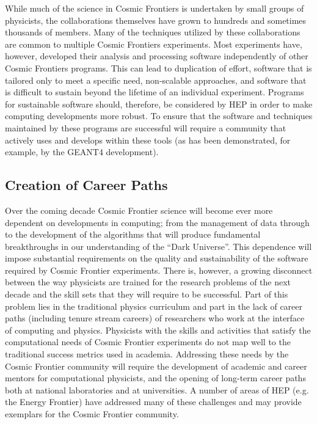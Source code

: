 While much of the science in Cosmic Frontiers is undertaken by small
groups of physicists, the collaborations themselves have grown to
hundreds and sometimes thousands of members. Many of the techniques
utilized by these collaborations are common to multiple Cosmic
Frontiers experiments. Most experiments have, however, developed their
analysis and processing software independently of other Cosmic
Frontiers programs. This can lead to duplication of effort, software
that is tailored only to meet a specific need, non-scalable
approaches, and software that is difficult to sustain beyond the
lifetime of an individual experiment. Programs for sustainable
software should, therefore, be considered by HEP in order to make
computing developments more robust. To ensure that the software and
techniques maintained by these programs are successful will require a
community that actively uses and develops within these tools (as has
been demonstrated, for example, by the GEANT4 development). 

\subsection{Creation of Career Paths} 

Over the coming decade Cosmic Frontier science will become ever more
dependent on developments in computing; from the management of data
through to the development of the algorithms that will produce
fundamental breakthroughs in our understanding of the ``Dark
Universe''. This dependence will impose substantial requirements on
the quality and sustainability of the software required by Cosmic
Frontier experiments. There is, however, a growing disconnect between
the way physicists are trained for the research problems of the next
decade and the skill sets that they will require to be
successful. Part of this problem lies in the traditional physics
curriculum and part in the lack of career paths (including tenure
stream careers) of researchers who work at the interface of computing
and physics. Physicists with the skills and activities that satisfy
the computational needs of Cosmic Frontier experiments do not map well
to the traditional success metrics used in academia. Addressing these
needs by the Cosmic Frontier community will require the development of
academic and career mentors for computational physicists, and the
opening of long-term career paths both at national laboratories and at
universities. A number of areas of HEP (e.g. the Energy Frontier) have
addressed many of these challenges and may provide exemplars for the
Cosmic Frontier community.


